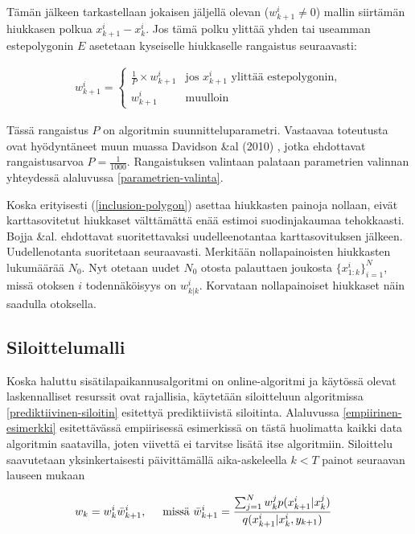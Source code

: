 \documentclass[
  12pt,
  a4paper, twoside]{book}
\begin{document}
Tämän jälkeen tarkastellaan jokaisen jäljellä olevan (\(w^i_{k+1} \neq 0\)) mallin siirtämän hiukkasen polkua \(x_{k+1}^i-x_{k}^i\). Jos tämä polku ylittää yhden tai useamman estepolygonin \(E\) asetetaan kyseiselle hiukkaselle rangaistus seuraavasti:

\begin{align}\label{exclusion-polygon}
\displaystyle w^i_{k+1}={\begin{cases} \frac{1}{P} \times w^i_{k+1}&\text{jos } x^i_{k+1} \text{ ylittää estepolygonin},\\
w^i_{k+1}& \text{muulloin }\end{cases}}\end{align}

Tässä rangaistus \(P\) on algoritmin suunnitteluparametri. Vastaavaa toteutusta ovat hyödyntäneet muun muassa Davidson \&al (2010) \citep{Davidson-2010}, jotka ehdottavat rangaistusarvoa \(P=\frac{1}{1000}\). Rangaistuksen valintaan palataan parametrien valinnan yhteydessä alaluvussa \ref{parametrien-valinta}.

Koska erityisesti (\ref{inclusion-polygon}) asettaa hiukkasten painoja nollaan, eivät karttasovitetut hiukkaset välttämättä enää estimoi suodinjakaumaa tehokkaasti. Bojja \&al. \citep{Bojja-2015} ehdottavat suoritettavaksi uudelleenotantaa karttasovituksen jälkeen. Uudellenotanta suoritetaan seuraavasti. Merkitään nollapainoisten hiukkasten lukumäärää \(N_0\). Nyt otetaan uudet \(N_0\) otosta palauttaen joukosta \(\{x_{1:k}^i\}_{i=1}^N\), missä otoksen \(i\) todennäköisyys on \(w^i_{k|k}\). Korvataan nollapainoiset hiukkaset näin saadulla otoksella.

\subsection{Siloittelumalli} \label{siloittelumalli}

Koska haluttu sisätilapaikannusalgoritmi on online-algoritmi ja käytössä olevat laskennalliset resurssit ovat rajallisia, käytetään siloitteluun algoritmissa \ref{prediktiivinen-siloitin} esitettyä prediktiivistä siloitinta. Alaluvussa \ref{empiirinen-esimerkki} esitettävässä empiirisessä esimerkissä on tästä huolimatta kaikki data algoritmin saatavilla, joten viivettä ei tarvitse lisätä itse algoritmiin. Siloittelu saavutetaan yksinkertaisesti päivittämällä aika-askeleella \(k < T\) painot seuraavan lauseen mukaan

\begin{align}
&w_k = w_k^i \bar{w}^i_{k+1}, \hspace{0.5cm} \text{missä } \bar{w}^i_{k+1} = \frac{\sum_{j=1}^{N}w_{k}^j p(x_{k+1}^i|x_k^j)}{q(x_{k+1}^i|x_k^i,y_{k+1})}
\end{align}
\end{document}
